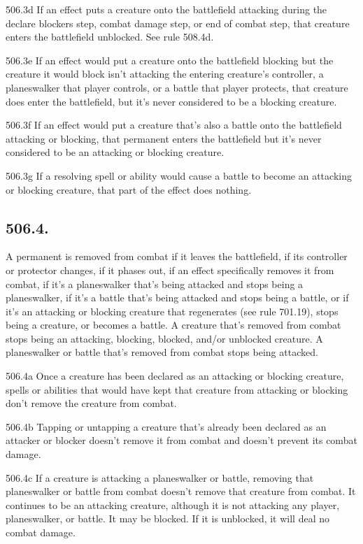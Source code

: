 506.3d If an effect puts a creature onto the battlefield attacking during the declare blockers step, combat damage step, or end of combat step, that creature enters the battlefield unblocked. See rule 508.4d.

506.3e If an effect would put a creature onto the battlefield blocking but the creature it would block isn’t attacking the entering creature’s controller, a planeswalker that player controls, or a battle that player protects, that creature does enter the battlefield, but it’s never considered to be a blocking creature.

506.3f If an effect would put a creature that’s also a battle onto the battlefield attacking or blocking, that permanent enters the battlefield but it’s never considered to be an attacking or blocking creature.

506.3g If a resolving spell or ability would cause a battle to become an attacking or blocking creature, that part of the effect does nothing.

\subsection*{506.4.}
A permanent is removed from combat if it leaves the battlefield, if its controller or protector changes, if it phases out, if an effect specifically removes it from combat, if it’s a planeswalker that’s being attacked and stops being a planeswalker, if it’s a battle that’s being attacked and stops being a battle, or if it’s an attacking or blocking creature that regenerates (see rule 701.19), stops being a creature, or becomes a battle. A creature that’s removed from combat stops being an attacking, blocking, blocked, and/or unblocked creature. A planeswalker or battle that’s removed from combat stops being attacked.

506.4a Once a creature has been declared as an attacking or blocking creature, spells or abilities that would have kept that creature from attacking or blocking don’t remove the creature from combat.

506.4b Tapping or untapping a creature that’s already been declared as an attacker or blocker doesn’t remove it from combat and doesn’t prevent its combat damage.

506.4c If a creature is attacking a planeswalker or battle, removing that planeswalker or battle from combat doesn’t remove that creature from combat. It continues to be an attacking creature, although it is not attacking any player, planeswalker, or battle. It may be blocked. If it is unblocked, it will deal no combat damage.

